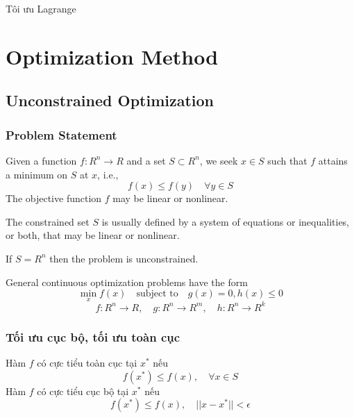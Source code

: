 Tôi ưu Lagrange











\section{Optimization Method}
\subsection{Unconstrained Optimization}
\subsubsection{Problem Statement}

Given a function $f:R^n\rightarrow R$ and a set $S \subset R^n$, we seek \( x \in S \) such that \( f \) attains a minimum on \( S \) at \( x \), i.e., 
\begin{equation*}
    f(x) \leq f(y) \quad \forall y \in S
\end{equation*}
The objective function \( f \) may be linear or nonlinear.

The constrained set $S$ is usually defined by a system of equations or inequalities, or both, that may be linear or nonlinear.

If $S = R^n$ then the problem is unconstrained.

General continuous optimization problems have the form
\begin{equation*}
    \underset{x}{\text{$\min$}} f(x) \quad \text{subject to} \quad g(x) = 0, h(x) \leq 0
\end{equation*}
\begin{equation*}
    f: R^n \rightarrow R, \quad g: R^n \rightarrow R^m, \quad h: R^n \rightarrow R^k
\end{equation*}
\subsubsection{Tối ưu cục bộ, tối ưu toàn cục}
Hàm $f$ có cực tiểu toàn cục tại $x^*$ nếu 
\begin{equation*}
    f(x^*) \leq f(x), \quad \forall x \in S
\end{equation*}
Hàm $f$ có cực tiểu cục bộ tại $x^*$ nếu 
\begin{equation*}
    f(x^*) \leq f(x),\quad || x - x^* || < \epsilon
\end{equation*}
